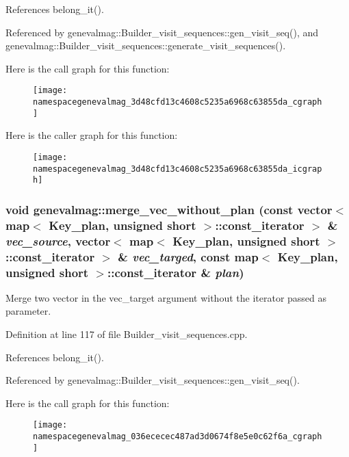 References belong\_\-it().

Referenced by genevalmag::Builder\_\-visit\_\-sequences::gen\_\-visit\_\-seq(), and genevalmag::Builder\_\-visit\_\-sequences::generate\_\-visit\_\-sequences().

Here is the call graph for this function:\nopagebreak
\begin{figure}[H]
\begin{center}
\leavevmode
\texttt{[image: namespacegenevalmag\_3d48cfd13c4608c5235a6968c63855da\_cgraph]}
\end{center}
\end{figure}


Here is the caller graph for this function:\nopagebreak
\begin{figure}[H]
\begin{center}
\leavevmode
\texttt{[image: namespacegenevalmag\_3d48cfd13c4608c5235a6968c63855da\_icgraph]}
\end{center}
\end{figure}
\hypertarget{namespacegenevalmag_036ececec487ad3d0674f8e5e0c62f6a}{
\subsubsection[{merge\_\-vec\_\-without\_\-plan}]{\setlength{\rightskip}{0pt plus 5cm}void genevalmag::merge\_\-vec\_\-without\_\-plan (const vector$<$ map$<$ {\bf Key\_\-plan}, unsigned short $>$::const\_\-iterator $>$ \& {\em vec\_\-source}, \/  vector$<$ map$<$ {\bf Key\_\-plan}, unsigned short $>$::const\_\-iterator $>$ \& {\em vec\_\-targed}, \/  const map$<$ {\bf Key\_\-plan}, unsigned short $>$::const\_\-iterator \& {\em plan})}}
\label{namespacegenevalmag_036ececec487ad3d0674f8e5e0c62f6a}


Merge two vector in the vec\_\-target argument without the iterator passed as parameter. 

Definition at line 117 of file Builder\_\-visit\_\-sequences.cpp.

References belong\_\-it().

Referenced by genevalmag::Builder\_\-visit\_\-sequences::gen\_\-visit\_\-seq().

Here is the call graph for this function:\nopagebreak
\begin{figure}[H]
\begin{center}
\leavevmode
\texttt{[image: namespacegenevalmag\_036ececec487ad3d0674f8e5e0c62f6a\_cgraph]}
\end{center}
\end{figure}


